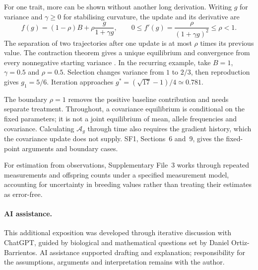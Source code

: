 For one trait, more can be shown without another long derivation. Writing
$g$ for variance and $\gamma\geq0$ for stabilising curvature, the update and
its derivative are
\begin{equation}
 f(g)=(1-\rho)B+\rho\frac{g}{1+\gamma g},
 \qquad
 0\leq f'(g)=\frac{\rho}{(1+\gamma g)^2}\leq\rho<1.
 \label{companion:eq:scalar}
\end{equation}
The separation of two trajectories after one update is at most $\rho$
times its previous value. The contraction theorem gives a unique
equilibrium and convergence
from every nonnegative starting variance \citep{GranasDugundji2003}.
In the recurring example, take $B=1$, $\gamma=0.5$ and $\rho=0.5$.
Selection changes variance from $1$ to $2/3$, then reproduction gives
$g_1=5/6$. Iteration approaches $g^*=(\sqrt{17}-1)/4\simeq0.781$.

The boundary $\rho=1$ removes the positive baseline contribution and needs
separate treatment. Throughout, a covariance equilibrium is conditional on
the fixed parameters; it is not a joint equilibrium of mean, allele
frequencies and covariance. Calculating $\mathcal A_g$ through time also
requires the gradient history, which the covariance update does not supply.
SF1, Sections~6 and~9, gives the fixed-point arguments and boundary cases.

For estimation from observations, Supplementary File~3 works through
repeated measurements and offspring counts under a specified measurement
model, accounting for uncertainty in breeding values rather than treating
their estimates as error-free.

\paragraph{AI assistance.}
This additional exposition was developed through iterative discussion with
ChatGPT, guided by biological and mathematical questions set by Daniel
Ortiz-Barrientos. AI assistance supported drafting and explanation;
responsibility for the assumptions, arguments and interpretation remains
with the author.
